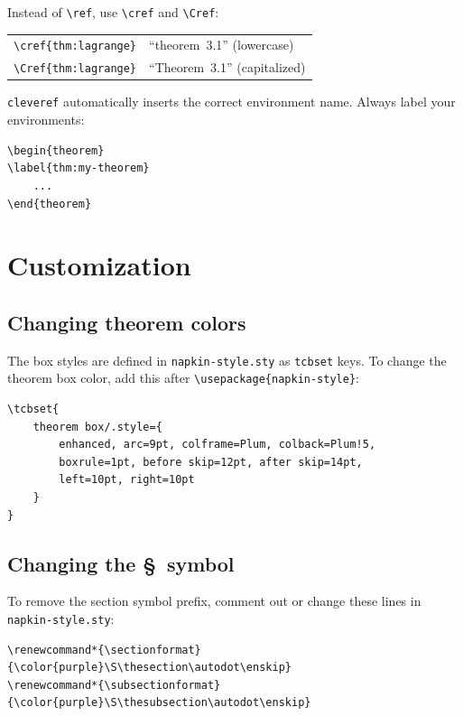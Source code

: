 \documentclass[11pt]{scrartcl}
\begin{document}
Instead of \verb|\ref|, use \verb|\cref| and \verb|\Cref|:

\begin{center}
\begin{tabular}{ll}
    \verb|\cref{thm:lagrange}|  & ``theorem~3.1'' (lowercase) \\
    \verb|\Cref{thm:lagrange}|  & ``Theorem~3.1'' (capitalized) \\
\end{tabular}
\end{center}

\texttt{cleveref} automatically inserts the correct environment name.
Always label your environments:
\begin{verbatim}
\begin{theorem}
\label{thm:my-theorem}
    ...
\end{theorem}
\end{verbatim}

\section{Customization}

\subsection{Changing theorem colors}

The box styles are defined in \texttt{napkin-style.sty} as \texttt{tcbset}
keys. To change the theorem box color, add this after \verb|\usepackage{napkin-style}|:
\begin{verbatim}
\tcbset{
    theorem box/.style={
        enhanced, arc=9pt, colframe=Plum, colback=Plum!5,
        boxrule=1pt, before skip=12pt, after skip=14pt,
        left=10pt, right=10pt
    }
}
\end{verbatim}

\subsection{Changing the \S~symbol}

To remove the section symbol prefix, comment out or change these lines
in \texttt{napkin-style.sty}:
\begin{verbatim}
\renewcommand*{\sectionformat}{\color{purple}\S\thesection\autodot\enskip}
\renewcommand*{\subsectionformat}{\color{purple}\S\thesubsection\autodot\enskip}
\end{verbatim}
\end{document}
